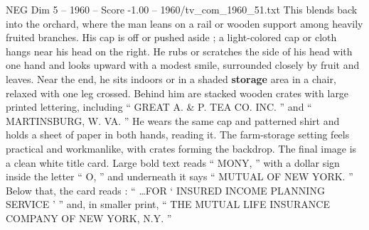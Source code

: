 \begin{textsample}{NEG Dim 5 – 1960 – Score -1.00 – 1960/tv\_com\_1960\_51.txt}
This blends back into the orchard, where the man leans on a rail or wooden support among heavily fruited branches.
His cap is off or pushed aside ; a light-colored cap or cloth hangs near his head on the right.
He rubs or scratches the side of his head with one hand and looks upward with a modest smile, surrounded closely by fruit and leaves.
Near the end, he sits indoors or in a shaded \textbf{storage} area in a chair, relaxed with one leg crossed.
Behind him are stacked wooden crates with large printed lettering, including “ GREAT A. \& P.
TEA CO.
INC. ” and “ MARTINSBURG, W.
VA. ” He wears the same cap and patterned shirt and holds a sheet of paper in both hands, reading it.
The farm-storage setting feels practical and workmanlike, with crates forming the backdrop.
The final image is a clean white title card.
Large bold text reads “ MONY, ” with a dollar sign inside the letter “ O, ” and underneath it says “ MUTUAL OF NEW YORK. ” Below that, the card reads : “ …FOR ‘ INSURED INCOME PLANNING SERVICE ’ ” and, in smaller print, “ THE MUTUAL LIFE INSURANCE COMPANY OF NEW YORK, N.Y. ”

\end{textsample}
